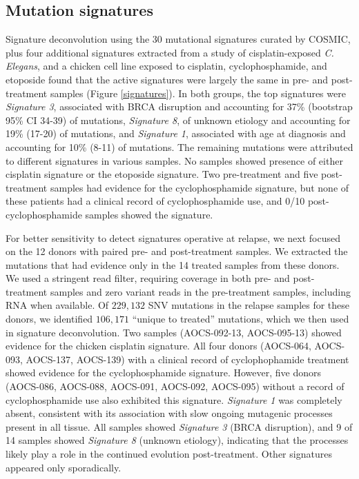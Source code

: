
\subsection*{Mutation signatures}
Signature deconvolution using the 30 mutational signatures curated by COSMIC\cite{364242}, plus four additional signatures extracted from a study of cisplatin-exposed \textit{C. Elegans}\cite{Meier_2014}, and a chicken cell line exposed to cisplatin, cyclophosphamide, and etoposide\cite{Szikriszt_2016} found that the active signatures were largely the same in pre- and post-treatment samples (Figure \ref{signatures}). In both groups, the top signatures were \textit{Signature 3}, associated with BRCA disruption and accounting for 37\% (bootstrap 95\% CI 34-39) of mutations, \textit{Signature 8}, of unknown etiology and accounting for 19\% (17-20) of mutations, and \textit{Signature 1}, associated with age at diagnosis and accounting for 10\% (8-11) of mutations. The remaining mutations were attributed to different signatures in various samples. No samples showed presence of either cisplatin signature or the etoposide signature. Two pre-treatment and five post-treatment samples had evidence for the cyclophosphamide signature, but none of these patients had a clinical record of cyclophosphamide use, and 0/10 post-cyclophosphamide samples showed the signature.

For better sensitivity to detect signatures operative at relapse, we next focused on the 12 donors with paired pre- and post-treatment samples. We extracted the mutations that had evidence only in the 14 treated samples from these donors. We used a stringent read filter, requiring coverage in both pre- and post-treatment samples and zero variant reads in the pre-treatment samples, including RNA when available. Of $229,132$ SNV mutations in the relapse samples for these donors, we identified $106,171$ ``unique to treated'' mutations, which we then used in signature deconvolution. Two samples (AOCS-092-13, AOCS-095-13) showed evidence for the chicken cisplatin signature. All four donors (AOCS-064, AOCS-093, AOCS-137, AOCS-139) with a clinical record of cyclophophamide treatment showed evidence for the cyclophosphamide signature. However, five donors (AOCS-086, AOCS-088, AOCS-091, AOCS-092, AOCS-095) without a  record of cyclophosphamide use also exhibited this signature. \textit{Signature 1} was completely absent, consistent with its association with slow ongoing mutagenic processes present in all tissue. All samples showed \textit{Signature 3} (BRCA disruption), and 9 of 14 samples showed \textit{Signature 8} (unknown etiology), indicating that the processes likely play a role in the continued evolution post-treatment. Other signatures appeared only sporadically.

